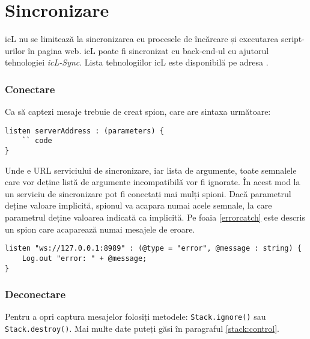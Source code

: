 \section{Sincronizare}
\label{sync}

icL nu se limitează la sincronizarea cu procesele de încărcare și executarea script-urilor în pagina web. icL poate fi sincronizat cu back-end-ul cu ajutorul tehnologiei \textit{icL-Sync}. Lista tehnologiilor icL este disponibilă pe adresa .

\subsubsection{Conectare}

Ca să captezi mesaje trebuie de creat spion, care are sintaxa următoare:
\begin{lstlisting}
listen serverAddress : (parameters) {
	`` code
}
\end{lstlisting}

Unde  e URL serviciului de sincronizare, iar  lista de argumente, toate semnalele care vor deține listă de argumente incompatibilă vor fi ignorate. În acest mod la un serviciu de sincronizare pot fi conectați mai mulți spioni. Dacă parametrul deține valoare implicită, spionul va acapara numai acele semnale, la care parametrul deține valoarea indicată ca implicită. Pe foaia \ref{errorcatch} este descris un spion care acaparează numai mesajele de eroare.


\begin{lstlisting}[caption=Captura erorilor, label=errorcatch]
listen "ws://127.0.0.1:8989" : (@type = "error", @message : string) {
	Log.out "error: " + @message;
}
\end{lstlisting}

\subsubsection{Deconectare}

Pentru a opri captura mesajelor folosiți metodele: \lstinline|Stack.ignore()| sau \lstinline|Stack.destroy()|. Mai multe date puteți găsi în paragraful \ref{stack:control}.